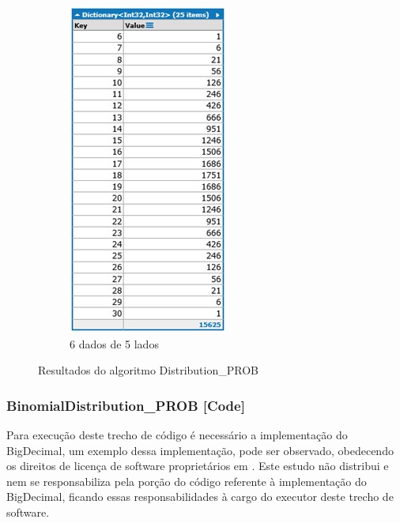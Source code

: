 \begin{apendicesenv}
\begin{figure}[H]
\begin{subfigure}[H]{0.47\linewidth}
	\includegraphics[width=.62\linewidth]{sections/images/Distribution_PROB_6_5.jpg}
	\caption{6 dados de 5 lados}
	\label{fig:Distribution_PROB_6_5}
	\end{subfigure}%
\caption{Resultados do algoritmo Distribution\_PROB}

\end{figure}

\subsubsection*{BinomialDistribution\_PROB [Code]}
Para execução deste trecho de código é necessário a implementação do BigDecimal, um exemplo dessa implementação, pode ser observado, obedecendo os direitos de licença de software proprietários em \cite{ github_bigdecimal}. Este estudo não distribui e nem se responsabiliza pela porção do código referente à implementação do BigDecimal, ficando essas responsabilidades  à cargo do executor deste trecho de software.


\end{apendicesenv}
